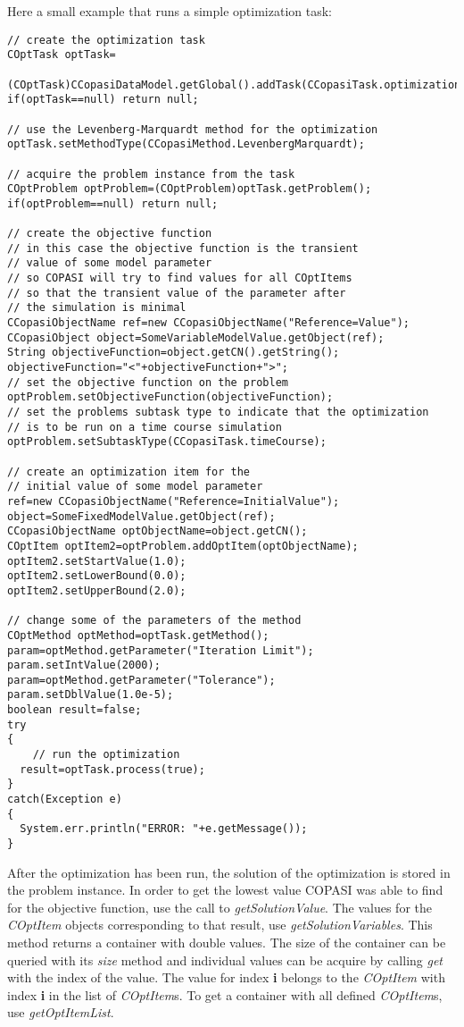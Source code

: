 \documentclass[a4,10pt]{article}
\begin{document}
Here a small example that runs a simple optimization task:

\begin{lstlisting}
// create the optimization task
COptTask optTask=
  (COptTask)CCopasiDataModel.getGlobal().addTask(CCopasiTask.optimization);
if(optTask==null) return null;

// use the Levenberg-Marquardt method for the optimization
optTask.setMethodType(CCopasiMethod.LevenbergMarquardt);

// acquire the problem instance from the task
COptProblem optProblem=(COptProblem)optTask.getProblem();
if(optProblem==null) return null;

// create the objective function
// in this case the objective function is the transient
// value of some model parameter
// so COPASI will try to find values for all COptItems
// so that the transient value of the parameter after
// the simulation is minimal
CCopasiObjectName ref=new CCopasiObjectName("Reference=Value");
CCopasiObject object=SomeVariableModelValue.getObject(ref);
String objectiveFunction=object.getCN().getString();
objectiveFunction="<"+objectiveFunction+">";
// set the objective function on the problem
optProblem.setObjectiveFunction(objectiveFunction);
// set the problems subtask type to indicate that the optimization
// is to be run on a time course simulation
optProblem.setSubtaskType(CCopasiTask.timeCourse);

// create an optimization item for the 
// initial value of some model parameter
ref=new CCopasiObjectName("Reference=InitialValue");
object=SomeFixedModelValue.getObject(ref);
CCopasiObjectName optObjectName=object.getCN();
COptItem optItem2=optProblem.addOptItem(optObjectName);
optItem2.setStartValue(1.0);
optItem2.setLowerBound(0.0);
optItem2.setUpperBound(2.0);

// change some of the parameters of the method
COptMethod optMethod=optTask.getMethod();
param=optMethod.getParameter("Iteration Limit");
param.setIntValue(2000);
param=optMethod.getParameter("Tolerance");
param.setDblValue(1.0e-5);
boolean result=false;
try
{
    // run the optimization
  result=optTask.process(true);
}
catch(Exception e)
{
  System.err.println("ERROR: "+e.getMessage());
}
\end{lstlisting}

After the optimization has been run, the solution of the optimization is stored in the problem instance.
In order to get the lowest value COPASI was able to find for the objective function, use the call to \textit{getSolutionValue}.
The values for the \textit{COptItem} objects corresponding to that result, use \textit{getSolutionVariables}. This method returns a container with double values. The size of the container can be queried with its \textit{size} method and individual values can be acquire by calling \textit{get} with the index of the value. The value for index \textbf{i} belongs to the \textit{COptItem} with index \textbf{i} in the list of \textit{COptItem}s.  To get a container with all defined \textit{COptItem}s, use \textit{getOptItemList}.
\end{document}
